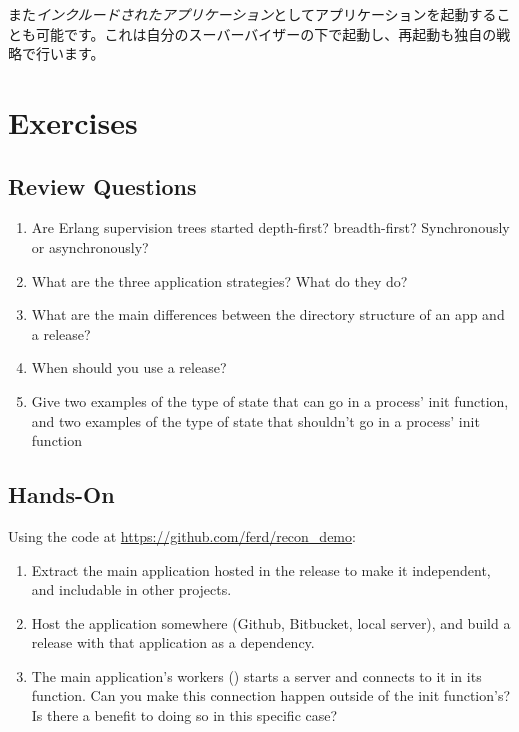 また\emph{インクルードされたアプリケーション}としてアプリケーションを起動することも可能です。これは自分のスーバーバイザーの下で起動し、再起動も独自の戦略で行います。

\section{Exercises}

\subsection*{Review Questions}

\begin{enumerate}
	\item  Are Erlang supervision trees started depth-first? breadth-first? Synchronously or asynchronously?
	\item What are the three application strategies? What do they do?
	\item What are the main differences between the directory structure of an app and a release?
	\item When should you use a release?
	\item Give two examples of the type of state that can go in a process' init function, and two examples of the type of state that shouldn't go in a process' init function
\end{enumerate}

\subsection*{Hands-On}

Using the code at \href{https://github.com/ferd/recon\_demo}{https://github.com/ferd/recon\_demo}:

\begin{enumerate}
	\item Extract the main application hosted in the release to make it independent, and includable in other projects.
	\item Host the application somewhere (Github, Bitbucket, local server), and build a release with that application as a dependency.
	\item The main application's workers () starts a server and connects to it in its  function. Can you make this connection happen outside of the init function's? Is there a benefit to doing so in this specific case?
\end{enumerate}

